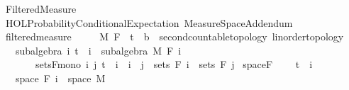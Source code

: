 %
\begin{isabellebody}%
%
%
\isadelimtheory
%
\endisadelimtheory
%
\isatagtheory
{}\isamarkupfalse%
\ Filtered{\isacharunderscore}{\kern0pt}Measure\isanewline
{}\ {\isachardoublequoteopen}HOL{\isacharminus}{\kern0pt}Probability{\isachardot}{\kern0pt}Conditional{\isacharunderscore}{\kern0pt}Expectation{\isachardoublequoteclose}\ Measure{\isacharunderscore}{\kern0pt}Space{\isacharunderscore}{\kern0pt}Addendum\isanewline
{}%
\endisatagtheory
{\isafoldtheory}%
%
\isadelimtheory
%
\endisadelimtheory
%
\isadelimdocument
%
\endisadelimdocument
%
\isatagdocument
%
\isamarkuptrue%
%
\endisatagdocument
{\isafolddocument}%
%
\isadelimdocument
%
\endisadelimdocument
{}\isamarkupfalse%
\ filtered{\isacharunderscore}{\kern0pt}measure\ {\isacharequal}{\kern0pt}\ \isanewline
\ \ \ M\ F\ \ t\ {\isacharcolon}{\kern0pt}{\isacharcolon}{\kern0pt}\ {\isachardoublequoteopen}{\isacharprime}{\kern0pt}b\ {\isacharcolon}{\kern0pt}{\isacharcolon}{\kern0pt}\ {\isacharbraceleft}{\kern0pt}second{\isacharunderscore}{\kern0pt}countable{\isacharunderscore}{\kern0pt}topology{\isacharcomma}{\kern0pt}\ linorder{\isacharunderscore}{\kern0pt}topology{\isacharbraceright}{\kern0pt}{\isachardoublequoteclose}\isanewline
\ \ \ subalgebra{\isacharcolon}{\kern0pt}\ {\isachardoublequoteopen}{\isasymAnd}i{\isachardot}{\kern0pt}\ t\ {\isasymle}\ i\ {\isasymLongrightarrow}\ subalgebra\ M\ {\isacharparenleft}{\kern0pt}F\ i{\isacharparenright}{\kern0pt}{\isachardoublequoteclose}\isanewline
\ \ \ \ \ \ \ sets{\isacharunderscore}{\kern0pt}F{\isacharunderscore}{\kern0pt}mono{\isacharcolon}{\kern0pt}\ {\isachardoublequoteopen}{\isasymAnd}i\ j{\isachardot}{\kern0pt}\ t\ {\isasymle}\ i\ {\isasymLongrightarrow}\ i\ {\isasymle}\ j\ {\isasymLongrightarrow}\ sets\ {\isacharparenleft}{\kern0pt}F\ i{\isacharparenright}{\kern0pt}\ {\isasymle}\ sets\ {\isacharparenleft}{\kern0pt}F\ j{\isacharparenright}{\kern0pt}{\isachardoublequoteclose}\isanewline
{}\isanewline
\isanewline
{}\isamarkupfalse%
\ space{\isacharunderscore}{\kern0pt}F{\isacharcolon}{\kern0pt}\ \isanewline
\ \ \ {\isachardoublequoteopen}t\ {\isasymle}\ i{\isachardoublequoteclose}\isanewline
\ \ \ {\isachardoublequoteopen}space\ {\isacharparenleft}{\kern0pt}F\ i{\isacharparenright}{\kern0pt}\ {\isacharequal}{\kern0pt}\ space\ M{\isachardoublequoteclose}\isanewline

\end{isabellebody}
